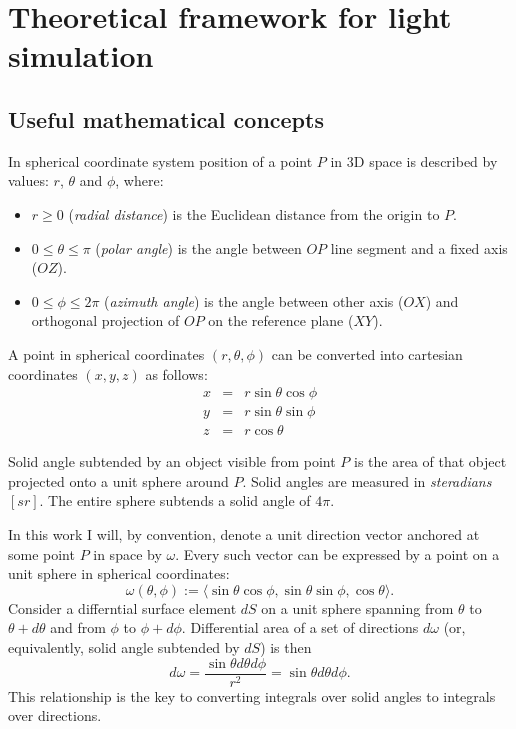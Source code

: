 \chapter{Theoretical framework for light simulation}

\section{Useful mathematical concepts}

\begin{df}
In spherical coordinate system position of a point $P$ in 3D space is described by values: $r$, $\theta$ and $\phi$, where:
\begin{itemize}
\item $r \geq 0$ (\emph{radial distance}) is the Euclidean distance from the origin to $P$.
\item $0 \leq \theta \leq \pi$ (\emph{polar angle}) is the angle between $OP$ line segment and a fixed axis ($OZ$).
\item $0 \leq \phi \leq 2\pi$ (\emph{azimuth angle}) is the angle between other axis ($OX$) and orthogonal projection of $OP$ on the reference plane ($XY$).
\end{itemize}
A point in spherical coordinates $(r, \theta, \phi)$ can be converted into cartesian coordinates $(x, y, z)$ as follows:
\begin{eqnarray}
  x &=& r \sin \theta \cos \phi \nonumber \\
  y &=& r \sin \theta \sin \phi \\
  z &=& r \cos \theta \nonumber
\end{eqnarray}
\end{df}

\begin{df}
Solid angle subtended by an object visible from point $P$ is the area of that object projected onto a unit sphere around $P$. Solid angles are measured in \emph{steradians} $[sr]$. The entire sphere subtends a solid angle of $4\pi$.
\end{df}

In this work I will, by convention, denote a unit direction vector anchored at some point $P$ in space by $\omega$. Every such vector can be expressed by a point on a unit sphere in spherical coordinates:
\begin{equation}
  \omega(\theta,\phi) := \langle \sin\theta\cos\phi, \sin\theta\sin\phi, \cos\theta \rangle.
\end{equation}
Consider a differntial surface element $dS$ on a unit sphere spanning from $\theta$ to $\theta + d\theta$ and from $\phi$ to $\phi + d\phi$. Differential area of a set of directions $d\omega$ (or, equivalently, solid angle subtended by $dS$) is then
\begin{equation}
  d\omega = \frac{\sin\theta d\theta d\phi}{r^{2}} = \sin\theta d\theta d\phi.
\end{equation}
This relationship is the key to converting integrals over solid angles to integrals over directions.


